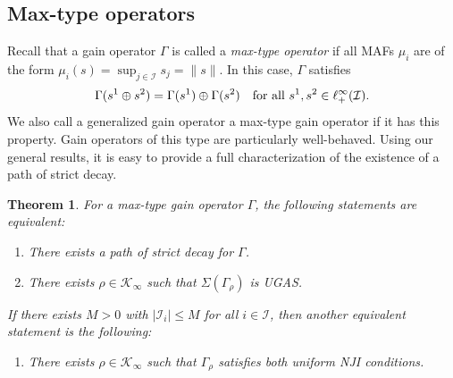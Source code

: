 \documentclass[10pt, oneside, a4paper]{article}
\newcommand{\IC}{\mathcal{I}}
\newcommand{\KC}{\mathcal{K}}
\newtheorem{theorem}{Theorem}[section]
\begin{document}
\subsection{Max-type operators}\label{subsec_maxtype}

Recall that a gain operator $\Gamma$ is called a \emph{max-type operator} if all MAFs $\mu_i$ are of the form $\mu_i(s) = \sup_{j\in\IC}s_j = \|s\|$. In this case, $\Gamma$ satisfies%
\begin{equation*}
  \Gamma(s^1 \oplus s^2) = \Gamma(s^1) \oplus \Gamma(s^2) \mbox{\quad for all\ } s^1,s^2 \in \ell^{\infty}_+(\IC).%
\end{equation*}
We also call a generalized gain operator a max-type gain operator if it has this property. Gain operators of this type are particularly well-behaved. Using our general results, it is easy to provide a full characterization of the existence of a path of strict decay.%

\begin{theorem}\label{thm_maxtype_main}
For a max-type gain operator $\Gamma$, the following statements are equivalent:%
\begin{enumerate}
\item[(a)] There exists a path of strict decay for $\Gamma$.%
\item[(b)] There exists $\rho \in \KC_{\infty}$ such that $\Sigma(\Gamma_{\rho})$ is UGAS.%
\end{enumerate}
If there exists $M > 0$ with $|\IC_i| \leq M$ for all $i \in \IC$, then another equivalent statement is the following:%
\begin{enumerate}
\item[(c)] There exists $\rho \in \KC_{\infty}$ such that $\Gamma_{\rho}$ satisfies both uniform NJI conditions.
\end{enumerate}
\end{theorem}
\end{document}
